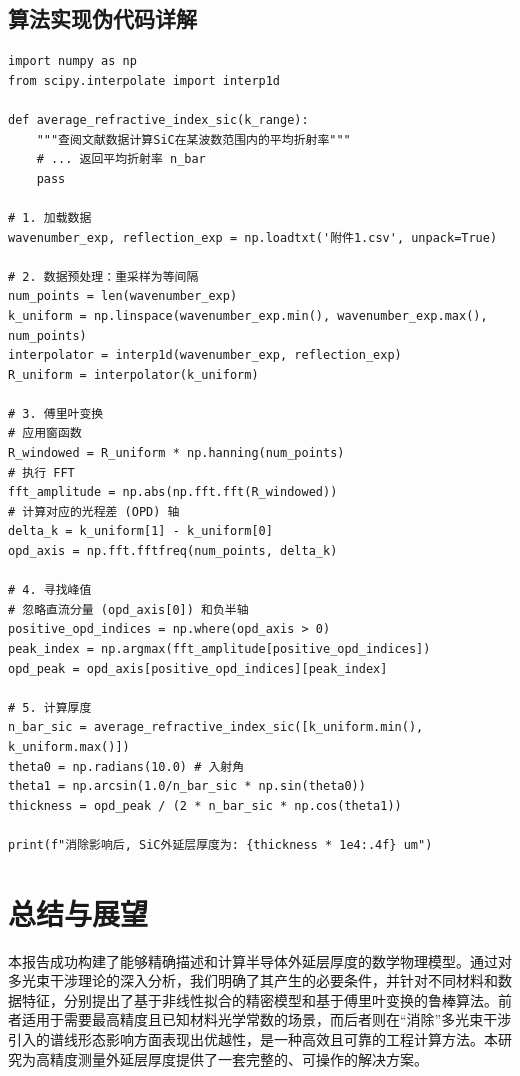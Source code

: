 \documentclass[UTF8, 11pt]{ctexart}
\begin{document}
\subsection{算法实现伪代码详解}
\begin{lstlisting}[caption={傅里叶变换法Python伪代码}, label={lst:ft}]
import numpy as np
from scipy.interpolate import interp1d

def average_refractive_index_sic(k_range):
    """查阅文献数据计算SiC在某波数范围内的平均折射率"""
    # ... 返回平均折射率 n_bar
    pass

# 1. 加载数据
wavenumber_exp, reflection_exp = np.loadtxt('附件1.csv', unpack=True)

# 2. 数据预处理：重采样为等间隔
num_points = len(wavenumber_exp)
k_uniform = np.linspace(wavenumber_exp.min(), wavenumber_exp.max(), num_points)
interpolator = interp1d(wavenumber_exp, reflection_exp)
R_uniform = interpolator(k_uniform)

# 3. 傅里叶变换
# 应用窗函数
R_windowed = R_uniform * np.hanning(num_points)
# 执行 FFT
fft_amplitude = np.abs(np.fft.fft(R_windowed))
# 计算对应的光程差 (OPD) 轴
delta_k = k_uniform[1] - k_uniform[0]
opd_axis = np.fft.fftfreq(num_points, delta_k)

# 4. 寻找峰值
# 忽略直流分量 (opd_axis[0]) 和负半轴
positive_opd_indices = np.where(opd_axis > 0)
peak_index = np.argmax(fft_amplitude[positive_opd_indices])
opd_peak = opd_axis[positive_opd_indices][peak_index]

# 5. 计算厚度
n_bar_sic = average_refractive_index_sic([k_uniform.min(), k_uniform.max()])
theta0 = np.radians(10.0) # 入射角
theta1 = np.arcsin(1.0/n_bar_sic * np.sin(theta0))
thickness = opd_peak / (2 * n_bar_sic * np.cos(theta1))

print(f"消除影响后, SiC外延层厚度为: {thickness * 1e4:.4f} um")
\end{lstlisting}

\section{总结与展望}
本报告成功构建了能够精确描述和计算半导体外延层厚度的数学物理模型。通过对多光束干涉理论的深入分析，我们明确了其产生的必要条件，并针对不同材料和数据特征，分别提出了基于非线性拟合的精密模型和基于傅里叶变换的鲁棒算法。前者适用于需要最高精度且已知材料光学常数的场景，而后者则在“消除”多光束干涉引入的谱线形态影响方面表现出优越性，是一种高效且可靠的工程计算方法。本研究为高精度测量外延层厚度提供了一套完整的、可操作的解决方案。
\end{document}
